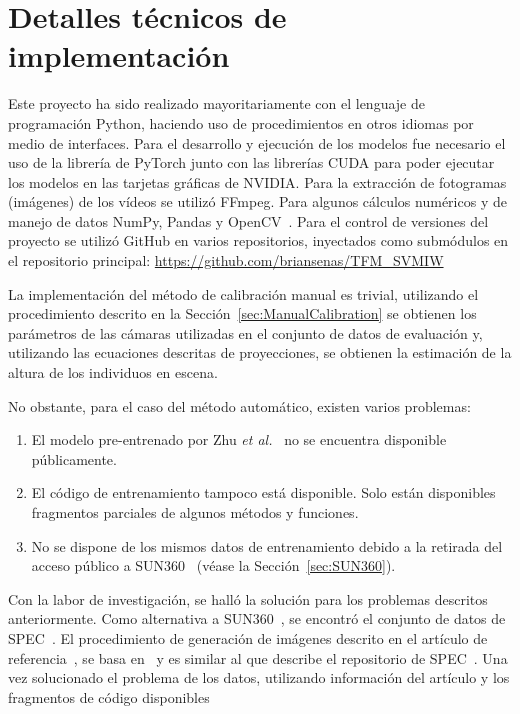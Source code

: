 \section{Detalles técnicos de implementación}\label{app:TechnicalDetails}
Este proyecto ha sido realizado mayoritariamente con el lenguaje de programación Python,
haciendo uso de procedimientos en otros idiomas por medio de interfaces. Para el desarrollo
y ejecución de los modelos fue necesario el uso de la librería de PyTorch junto con las
librerías CUDA para poder ejecutar los modelos en las tarjetas gráficas de NVIDIA. Para
la extracción de fotogramas (imágenes) de los vídeos se utilizó FFmpeg. Para algunos cálculos
numéricos y de manejo de datos NumPy, Pandas y OpenCV~\cite{opencv_library}. Para el control de
versiones del proyecto se utilizó GitHub en varios repositorios, inyectados como submódulos
en el repositorio principal: \url{https://github.com/briansenas/TFM_SVMIW}
\par
La implementación del método de calibración manual es trivial, utilizando el procedimiento
descrito en la Sección~\ref{sec:ManualCalibration} se obtienen
los parámetros de las cámaras utilizadas en el conjunto de datos de evaluación y, utilizando las ecuaciones
descritas de proyecciones, se obtienen la estimación de la altura de los individuos en escena.
\par
No obstante, para el caso del método automático, existen varios problemas:
\begin{enumerate}
\item El modelo pre-entrenado por Zhu \emph{et al.}~\cite{SVMIW} no se encuentra disponible públicamente.
\item El código de entrenamiento tampoco está disponible. Solo están disponibles fragmentos parciales
  de algunos métodos y funciones.
\item No se dispone de los mismos datos de entrenamiento debido a la retirada del acceso público a SUN360~\cite{SUN360} (véase la Sección~\ref{sec:SUN360}).
\end{enumerate}
Con la labor de investigación, se halló la solución para los problemas descritos anteriormente.
Como alternativa a SUN360~\cite{SUN360}, se encontró el conjunto de datos de SPEC~\cite{SPEC}. El
procedimiento de generación de imágenes descrito en el artículo de referencia~\cite{SVMIW},
se basa en~\cite{CalibDataGeneration} y es similar al que describe el repositorio de SPEC~\cite{SPEC}.
Una vez solucionado el problema de los datos, utilizando información del artículo y los fragmentos de código disponibles
